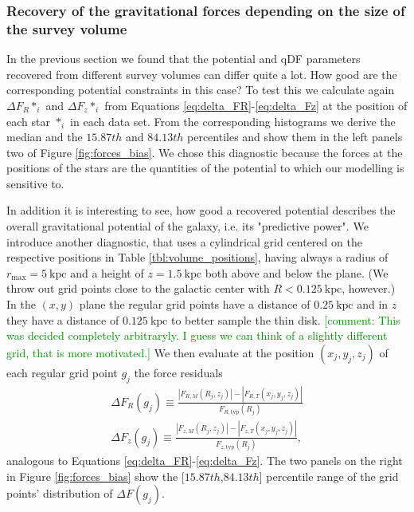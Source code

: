 \documentclass[iop,revtex4,numberedappendix,appendixfloats]{emulateapj}
\newcommand{\HW}[1]{\textcolor{Green}{#1}}
\begin{document}
\subsubsection{Recovery of the gravitational forces depending on the size of the survey volume}\label{sec:forces_bias}

In the previous section we found that the potential and qDF parameters recovered from different survey volumes can differ quite a lot. How good are the corresponding potential constraints in this case? To test this we calculate again $\Delta F_R{*_i}$ and $\Delta F_z{*_i}$ from Equations \eqref{eq:delta_FR}-\eqref{eq:delta_Fz} at the position of each star $*_i$ in each data set. From the corresponding histograms we derive the median and the $15.87th$ and $84.13th$ percentiles and show them in the left panels two of Figure \ref{fig:forces_bias}. We chose this diagnostic because the forces at the positions of the stars are the quantities of the potential to which our modelling is sensitive to.

In addition it is interesting to see, how good a recovered potential describes the overall gravitational potential of the galaxy, i.e. its "predictive power". We introduce another diagnostic, that uses a cylindrical grid centered on the respective positions in Table \ref{tbl:volume_positions}, having always a radius of $r_\text{max}=5~\text{kpc}$ and a height of $z=1.5~\text{kpc}$ both above and below the plane. (We throw out grid points close to the galactic center with $R<0.125~\text{kpc}$, however.)  In the $(x,y)$ plane the regular grid points have a distance of $0.25~\text{kpc}$ and in $z$ they have a distance of  $0.125~\text{kpc}$ to better sample the thin disk. \HW{[comment: This was decided completely arbitraryly. I guess we can think of a slightly different grid, that is more motivated.]} We then evaluate at the position $(x_j,y_j,z_j)$ of each regular grid point $g_j$ the force residuals
\begin{eqnarray}
\Delta F_R(g_j) \equiv \frac{|F_{R,M}(R_j,z_j)| - |F_{R,T}(x_j,y_j,z_j)|}{F_{R,\text{typ}}(R_j)} \label{eq:delta_FR_grid}\\
\Delta F_z(g_j) \equiv \frac{|F_{z,M}(R_j,z_j)| - |F_{z,T}(x_j,y_j,z_j)|}{F_{z,\text{typ}}(R_j)},\label{eq:delta_Fz_grid}
\end{eqnarray}
analogous to Equations \eqref{eq:delta_FR}-\eqref{eq:delta_Fz}. The two panels on the right in Figure \ref{fig:forces_bias} show the [$15.87th$,$84.13th$] percentile range of the grid points' distribution of $\Delta F(g_j)$.
\end{document}
